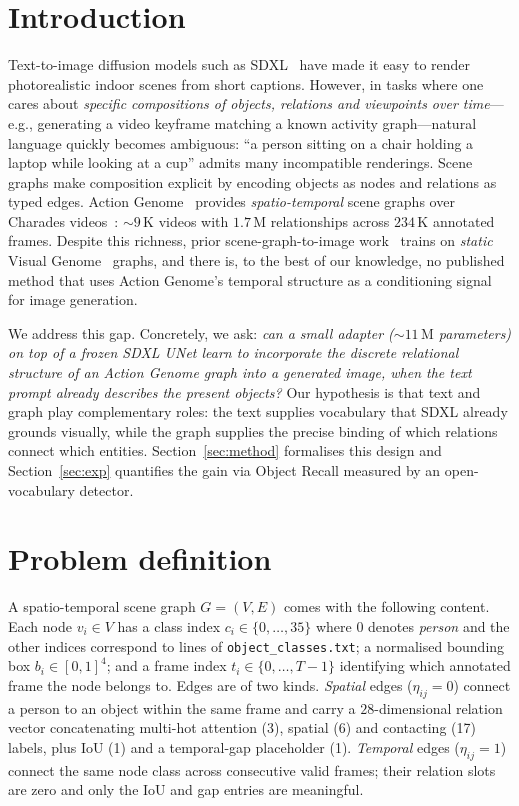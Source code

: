 \documentclass[11pt]{article}
\begin{document}
\section{Introduction}
Text-to-image diffusion models such as SDXL~\cite{podell2023sdxl} have
made it easy to render photorealistic indoor scenes from short captions.
However, in tasks where one cares about \emph{specific compositions of
objects, relations and viewpoints over time}---e.g., generating a video
keyframe matching a known activity graph---natural language quickly
becomes ambiguous: ``a person sitting on a chair holding a laptop while
looking at a cup'' admits many incompatible renderings. Scene graphs
make composition explicit by encoding objects as nodes and relations as
typed edges. Action Genome~\cite{ji2020actiongenome} provides
\emph{spatio-temporal} scene graphs over Charades
videos~\cite{sigurdsson2016charades}:
$\sim 9\,\text{K}$ videos with $1.7\,\text{M}$ relationships across
$234\,\text{K}$ annotated frames.  Despite this richness, prior
scene-graph-to-image work~\cite{yang2022sgdiff,shen2024sgadapter}
trains on \emph{static} Visual Genome~\cite{krishna2017vg} graphs, and there is, to the best
of our knowledge, no published method that uses Action Genome's temporal
structure as a conditioning signal for image generation.

We address this gap. Concretely, we ask: \emph{can a small adapter
($\sim 11\,\text{M}$ parameters) on top of a frozen SDXL UNet learn to
incorporate the discrete relational structure of an Action Genome graph
into a generated image, when the text prompt already describes the
present objects?}  Our hypothesis is that text and graph play
complementary roles: the text supplies vocabulary that SDXL already
grounds visually, while the graph supplies the precise binding of which
relations connect which entities.  Section~\ref{sec:method} formalises
this design and Section~\ref{sec:exp} quantifies the gain via Object
Recall measured by an open-vocabulary detector.

\section{Problem definition}
A spatio-temporal scene graph $G=(V,E)$ comes with the following
content. Each node $v_i \in V$ has a class index $c_i \in
\{0,\ldots,35\}$ where $0$ denotes \emph{person} and the other indices
correspond to lines of \texttt{object\_classes.txt}; a normalised
bounding box $b_i \in [0,1]^4$; and a frame index
$t_i \in \{0,\ldots,T-1\}$ identifying which annotated frame the node
belongs to. Edges are of two kinds. \emph{Spatial} edges
($\eta_{ij}=0$) connect a person to an object within the same frame and
carry a $28$-dimensional relation vector concatenating multi-hot
attention (3), spatial (6) and contacting (17) labels, plus IoU (1) and
a temporal-gap placeholder (1). \emph{Temporal} edges ($\eta_{ij}=1$)
connect the same node class across consecutive valid frames; their
relation slots are zero and only the IoU and gap entries are meaningful.
\end{document}

